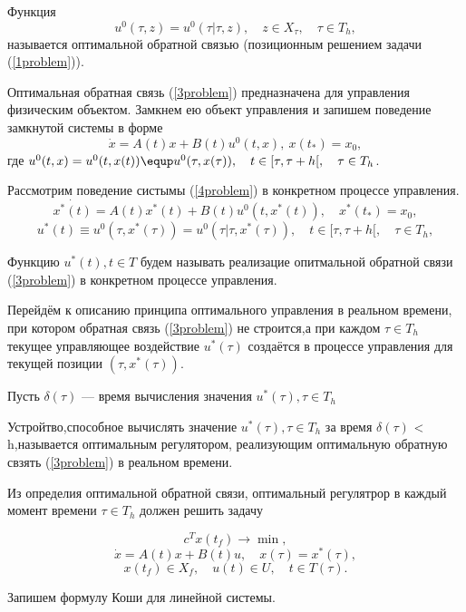 Функция
\begin{equation} \label{3problem}
    u^0(\tau,z) = u^0(\tau|\tau,z),\quad z\in X_\tau,\quad \tau \in T_h,
    \end{equation}
называется оптимальной обратной связью (позиционным решением задачи (\ref{1problem})).

Оптимальная обратная связь (\ref{3problem}) предназначена для управления физическим объектом. Замкнем ею объект управления и запишем поведение замкнутой системы в форме
\begin{equation} \label{4problem}
\dot{x}=A(t)x+B(t)u^0(t,x),\ x(t_*) = x_0,
 \end{equation}
где $u^0(t,x) = u^0(t,x(t))\equp u^0(\tau,x(\tau)),\quad t\in [\tau,\tau + h[,\quad \tau\in T_h$.

Рассмотрим поведение систымы (\ref{4problem}) в конкретном процессе управления.
$$\dot{x^*(t)}=A(t)x^*(t)+B(t)u^0(t,x^*(t)),\quad x^*(t_*) = x_0,$$
$$u^*(t)\equiv u^0(\tau,x^*(\tau)) = u^0(\tau|\tau,x^*(\tau)),\quad t\in[\tau,\tau + h[,\quad  \tau \in T_h,$$

Функцию $u^*(t), t\in T$ будем называть реализацие опитмальной обратной связи (\ref{3problem}) в конкретном процессе управления. 


Перейдём к описанию принципа оптимального управления в реальном времени, при котором обратная связь  (\ref{3problem}) не строится,а при каждом $\tau \in T_h$ текущее управляющее воздействие $u^*(\tau)$ создаётся в процессе управления для текущей позиции $(\tau,x^*(\tau))$.

Пусть  $\delta(\tau)$ — время вычисления значения $u^*(\tau), \tau \in T_h$
\begin{definition}
Устройтво,способное вычислять значение $u^*(\tau), \tau \in T_h$ за время $\delta(\tau)$ < h,называется оптимальным регулятором, реализующим оптимальную обратную свзять (\ref{3problem}) в реальном времени.
\end{definition}

Из определия оптимальной обратной связи, оптимальный регулятрор в каждый момент времени $\tau \in T_h$ должен решить задачу

\begin{equation} \label{5problem}
    c^Tx(t_f)\to \min,
    \end{equation}
$$
    \dot{x}=A(t)x+B(t)u,\quad x(\tau) = x^*(\tau),
    $$
$$
    x(t_f) \in X_f,\quad  u(t)\in U, \quad  t\in T(\tau).
    $$
    
Запишем формулу Коши для линейной системы.

